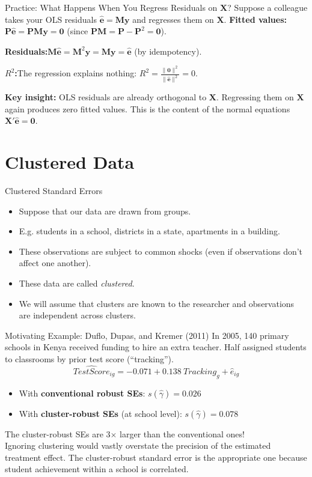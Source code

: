 \documentclass[aspectratio=169, handout, t]{beamer}
\numberwithin{equation}{section}
\begin{document}
\begin{frame}{Practice: What Happens When You Regress Residuals on $\bm{X}$?}
Suppose a colleague takes your OLS residuals $\hat{\bm{e}}=\bm{M}\bm{y}$ and regresses them on $\bm{X}$.
\pause
\medskip
\textbf{Fitted values:}\quad $\bm{P}\hat{\bm{e}}=\bm{P}\bm{M}\bm{y}=\bm{0}$
\quad (since $\bm{PM}=\bm{P}-\bm{P}^2=\bm{0}$).
\pause

\medskip
\textbf{Residuals:}\quad $\bm{M}\hat{\bm{e}}=\bm{M}^2\bm{y}=\bm{M}\bm{y}=\hat{\bm{e}}$
\quad (by idempotency).
\pause

\medskip
\textbf{$R^2$:}\quad The regression explains nothing: $R^2=\frac{\|\bm{0}\|^2}{\|\hat{\bm{e}}\|^2}=0$.
\pause

\begin{tcolorbox}[colback=blue!5, colframe=blue!50]
\textbf{Key insight:} OLS residuals are already orthogonal to $\bm{X}$. Regressing them on $\bm{X}$ again produces zero fitted values. This is the content of the normal equations $\bm{X}'\hat{\bm{e}}=\bm{0}$.
\end{tcolorbox}
\end{frame}

\section{Clustered Data}
\begin{frame}{Clustered Standard Errors}
\begin{itemize}
\item Suppose that our data are drawn from groups.
\item[] E.g. students in a school, districts in a state, apartments in a building.
\item These observations are subject to common shocks (even if observations don't affect one another).
\item These data are called \emph{clustered}.
\item We will assume that clusters are known to the researcher and observations are independent across clusters.
\end{itemize}
\end{frame}

\begin{frame}{Motivating Example: Duflo, Dupas, and Kremer (2011)}
In 2005, 140 primary schools in Kenya received funding to hire an extra teacher. Half assigned students to classrooms by prior test score (``tracking'').
$$\widehat{TestScore}_{ig}=-0.071+0.138\ Tracking_g+\hat{e}_{ig}$$
\pause
\begin{itemize}
\item With \textbf{conventional robust SEs}: $s(\hat{\gamma})=0.026$
\item With \textbf{cluster-robust SEs} (at school level): $s(\hat{\gamma})=0.078$
\end{itemize}
\pause
\medskip
The cluster-robust SEs are \alert{3$\times$ larger} than the conventional ones!\\[6pt]
Ignoring clustering would vastly overstate the precision of the estimated treatment effect.  The cluster-robust standard error is the appropriate one because student achievement within a school is correlated.
\end{frame}
\end{document}
